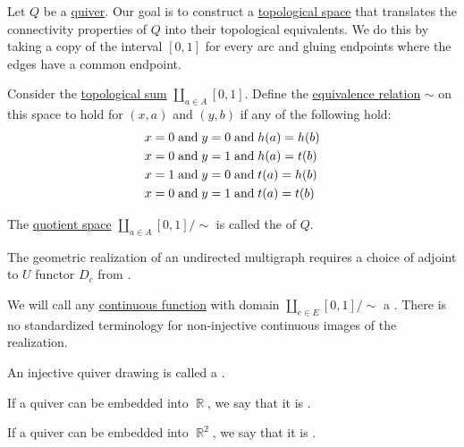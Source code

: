 \begin{definition}\label{def:graph_geometric_realization}
  Let \( Q \) be a \hyperref[def:quiver]{quiver}. Our goal is to construct a \hyperref[def:topological_space]{topological space} that translates the connectivity properties of \( Q \) into their topological equivalents. We do this by taking a copy of the interval \( [0, 1] \) for every arc and gluing endpoints where the edges have a common endpoint.

  Consider the \hyperref[def:topological_sum]{topological sum} \( \coprod_{a \in A} [0, 1] \). Define the \hyperref[def:equivalence_relation]{equivalence relation} \( {\sim} \) on this space to hold for \( (x, a) \) and \( (y, b) \) if any of the following hold:
  \begin{align*}
    &x = 0 \T{and} y = 0 \T{and} h(a) = h(b) \\
    &x = 0 \T{and} y = 1 \T{and} h(a) = t(b) \\
    &x = 1 \T{and} y = 0 \T{and} t(a) = h(b) \\
    &x = 0 \T{and} y = 1 \T{and} t(a) = t(b)
  \end{align*}

  The \hyperref[def:topological_quotient]{quotient space} \( \coprod_{a \in A} [0, 1] / {\sim} \) is called the  of \( Q \).

  \begin{thmenum}
     The geometric realization of an undirected multigraph requires a choice of adjoint to \( U \) functor \( D_c \) from .

     We will call any \hyperref[def:global_continuity]{continuous function} with domain \( \coprod_{e \in E} [0, 1] / {\sim} \) a . There is no standardized terminology for non-injective continuous images of the realization.

     An injective quiver drawing is called a .

     If a quiver can be embedded into \( \BbbR \), we say that it is .

     If a quiver can be embedded into \( \BbbR^2 \), we say that it is .
  \end{thmenum}
\end{definition}

